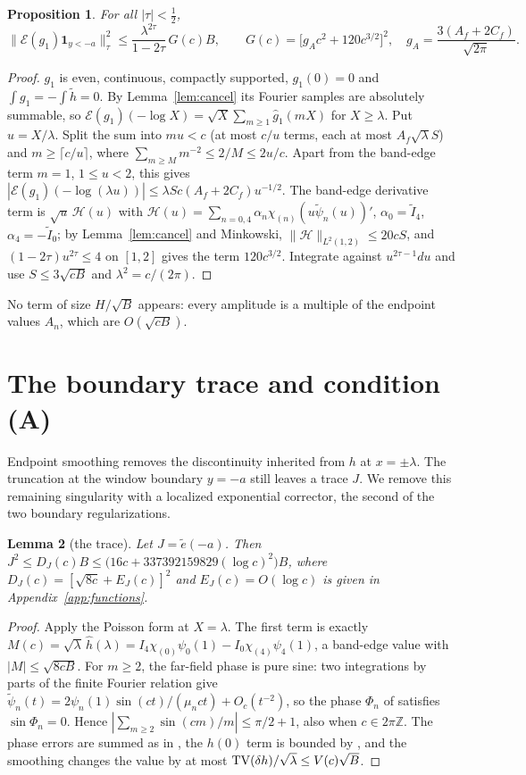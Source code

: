 \documentclass[11pt]{amsart}
\newtheorem{proposition}{Proposition}[section]
\newtheorem{lemma}[proposition]{Lemma}
\theoremstyle{remark}
\numberwithin{equation}{section}
\newcommand{\E}{\mathcal{E}}
\begin{document}
\begin{proposition}\label{prop:Eg1}
For all $|\tau|<\frac12$,
\[
\|\E(g_1)\mathbf 1_{y<-a}\|_\tau^2\le\frac{\lambda^{2\tau}}{1-2\tau}\,G(c)B,\qquad G(c)=\bigl[g_Ac^2+120c^{3/2}\bigr]^2,\quad g_A=\frac{3(A_f+2C_f)}{\sqrt{2\pi}}.
\]
\end{proposition}
\begin{proof}
$g_1$ is even, continuous, compactly supported, $g_1(0)=0$ and $\int g_1=-\int\tilde h=0$. By Lemma~\ref{lem:cancel} its Fourier samples are absolutely summable, so $\E(g_1)(-\log X)=\sqrt X\sum_{m\ge1}\hat g_1(mX)$ for $X\ge\lambda$. Put $u=X/\lambda$. Split the sum into $mu<c$ (at most $c/u$ terms, each at most $A_f\sqrt\lambda S$) and $m\ge\lceil c/u\rceil$, where $\sum_{m\ge M}m^{-2}\le2/M\le2u/c$. Apart from the band-edge term $m=1$, $1\le u<2$, this gives $|\E(g_1)(-\log(\lambda u))|\le\lambda Sc(A_f+2C_f)u^{-1/2}$. The band-edge derivative term is $\sqrt u\,\mathcal H(u)$ with $\mathcal H(u)=\sum_{n=0,4}\alpha_n\chi_{(n)}(u\tilde\psi_n(u))'$, $\alpha_0=\tilde I_4$, $\alpha_4=-\tilde I_0$; by Lemma~\ref{lem:cancel} and Minkowski, $\|\mathcal H\|_{L^2(1,2)}\le20cS$, and $(1-2\tau)u^{2\tau}\le4$ on $[1,2]$ gives the term $120c^{3/2}$. Integrate against $u^{2\tau-1}du$ and use $S\le3\sqrt{cB}$ and $\lambda^2=c/(2\pi)$.
\end{proof}

No term of size $H/\sqrt B$ appears: every amplitude is a multiple of the endpoint values $A_n$, which are $O(\sqrt{cB})$.

\section{The boundary trace and condition (A)}\label{sec:A}

Endpoint smoothing removes the discontinuity inherited from $h$ at $x=\pm\lambda$. The truncation at the window boundary $y=-a$ still leaves a trace $J$. We remove this remaining singularity with a localized exponential corrector, the second of the two boundary regularizations.

\begin{lemma}[the trace]\label{lem:J}
Let $J=\tilde e(-a)$. Then $J^2\le D_J(c)B\le\bigl(16c+337392159829(\log c)^2\bigr)B$, where $D_J(c)=[\sqrt{8c}+E_J(c)]^2$ and $E_J(c)=O(\log c)$ is given in Appendix~\ref{app:functions}.
\end{lemma}
\begin{proof}
Apply the Poisson form at $X=\lambda$. The first term is exactly $M(c)=\sqrt\lambda\,\hat h(\lambda)=I_4\chi_{(0)}\psi_0(1)-I_0\chi_{(4)}\psi_4(1)$, a band-edge value with $|M|\le\sqrt{8cB}$. For $m\ge2$, the far-field phase is pure sine: two integrations by parts of the finite Fourier relation give $\tilde\psi_n(t)=2\psi_n(1)\sin(ct)/(\mu_nct)+O_c(t^{-2})$, so the phase $\Phi_n$ of \cite[Lemma~3.6]{MoriWeilII} satisfies $\sin\Phi_n=0$. Hence $|\sum_{m\ge2}\sin(cm)/m|\le\pi/2+1$, also when $c\in2\pi\mathbb Z$. The phase errors are summed as in \cite[Lemma~4.1]{MoriWeilII}, the $h(0)$ term is bounded by \cite[Lemma~3.4]{MoriWeilII}, and the smoothing changes the value by at most ${\rm TV}(\delta h)/\sqrt\lambda\le V(c)\sqrt B$.
\end{proof}
\end{document}
